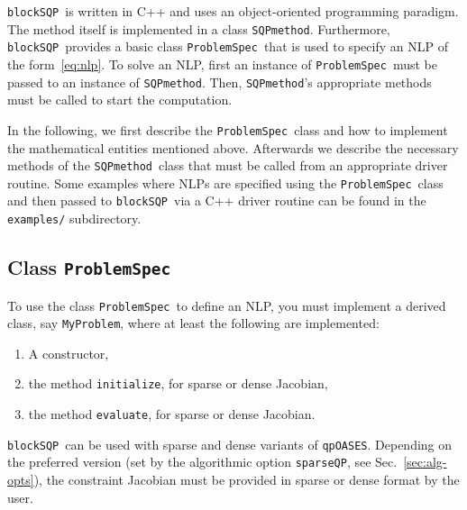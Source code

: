 \documentclass[	11pt,
				a4paper,
				abstract=true,
				twoside=true,
				bibliography=totoc, 
				headinclude=true,
				footinclude=false]{scrartcl}
\newcommand{\qpOASES}{\texttt{qpOASES}}
\newcommand{\blockSQP}{\texttt{blockSQP}}
\newcommand{\method}{\texttt{SQPmethod}}
\newcommand{\problem}{\texttt{ProblemSpec}}
\newcommand{\myproblem}{\texttt{MyProblem}}
\newcommand{\init}{\texttt{initialize}}
\newcommand{\evaluate}{\texttt{evaluate}}
\begin{document}
\blockSQP\ is written in C++ and uses an object-oriented programming paradigm. The method itself is implemented in a class \method. Furthermore, \blockSQP\ provides a basic class \problem\ that is used to specify an NLP of the form~\eqref{eq:nlp}. To solve an NLP, first an instance of \problem\ must be passed to an instance of \method. Then, \method's appropriate methods must be called to start the computation.

In the following, we first describe the \problem\ class and how to implement the mathematical entities mentioned above. 
Afterwards we describe the necessary methods of the \method\ class that must be called from an appropriate driver routine. Some examples where NLPs are specified using the \problem\ class and then passed to \blockSQP\ via a C++ driver routine can be found in the \texttt{examples/} subdirectory.


\subsection{Class \problem}
To use the class \problem\ to define an NLP, you must implement a derived class, say \myproblem, where at least the following are implemented:
\begin{enumerate}
\item A constructor,
\item the method \init, for sparse or dense Jacobian,
\item the method \evaluate, for sparse or dense Jacobian.
\end{enumerate}
\blockSQP\ can be used with sparse and dense variants of \qpOASES. Depending on the preferred version (set by the algorithmic option \texttt{sparseQP}, see Sec.~\ref{sec:alg-opts}), the constraint Jacobian must be provided in sparse or dense format by the user.
\end{document}
